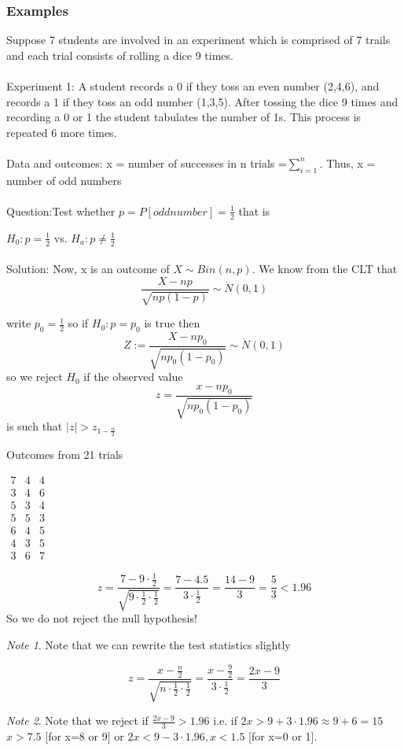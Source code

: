 \documentclass[12pt,a4paper]{article}
\theoremstyle{regla}
\theoremstyle{remark}
\newtheorem{notes}{Note}[section]
\theoremstyle{definition}
\theoremstyle{nonumberbreak}
\begin{document}
\subsubsection{Examples}
\begin{xmpl}
Suppose 7 students are involved in an experiment which is comprised of 7 trails and each trial consists of rolling a dice 9 times.\\
\\
Experiment 1: A student records a 0 if they toss an even number (2,4,6), and records a 1 if they toss an odd number (1,3,5). After tossing the dice 9 times and recording a 0 or 1 the student tabulates the number of 1s. This process is repeated 6 more times. \\
\\
Data and outcomes: 
x = number of successes in n trials =$\sum_{i=1}^n$.
Thus, x = number of odd numbers\\\\

Question:Test whether $p=P[odd number]=\frac{1}{2}$ that is 
		
$H_0: p=\frac{1}{2}$ vs. $H_a: p\neq \frac{1}{2}$
 \\\\
Solution:
Now, x is an outcome of $X \sim Bin(n,p)$. We know from the CLT that
$$\frac{X-np}{\sqrt{np(1-p)}} \sim\dot N(0,1)$$

write $p_0=\frac{1}{2}$ so if $H_0:p=p_0$ is true then
$$Z:=\frac{X-np_0}{\sqrt{np_0(1-p_0)}}\sim\dot N(0,1)$$
so we reject $H_0$ if the observed value
$$z=\frac{x-np_0}{\sqrt{np_0(1-p_0)}}$$
is such that 
$\left | z\right | >z_{1-\frac{\alpha}{2}}$



Outcomes from 21 trials 


$\begin{matrix}
7	& 4 & 4\\
3 & 4 & 6\\
5 & 3 & 4\\
5 & 5 & 3\\
6 & 4 & 5\\
4 & 3 & 5\\
3 & 6 & 7
\end{matrix}$

$$z=\frac{7-9\cdot \frac{1}{2}}{\sqrt{9\cdot\frac{1}{2}\cdot \frac{1}{2}}}=\frac{7-4.5}{3\cdot\frac{1}{2}}=\frac{14-9}{3}=\frac{5}{3} < 1.96$$
So we do not reject the null hypothesis! 
\\
\begin{notes}
Note that we can rewrite the test statistics slightly

$$z=\frac{x-\frac{n}{2}}{\sqrt{n\cdot\frac{1}{2}\cdot\frac{1}{2}}}=\frac{x-\frac{9}{2}}{3\cdot\frac{1}{2}}=\frac{2x-9}{3}$$
\end{notes}
\begin{notes}
Note that we reject if $\frac{2x-9}{3}>1.96$ i.e. if $2x>9+3\cdot1.96 \approx 9+6=15$\\

$x>7.5$ [for x=8 or 9] or $2x<9-3\cdot1.96, x<1.5$ [for x=0 or 1].
\end{notes}
\end {xmpl}
\end{document}
